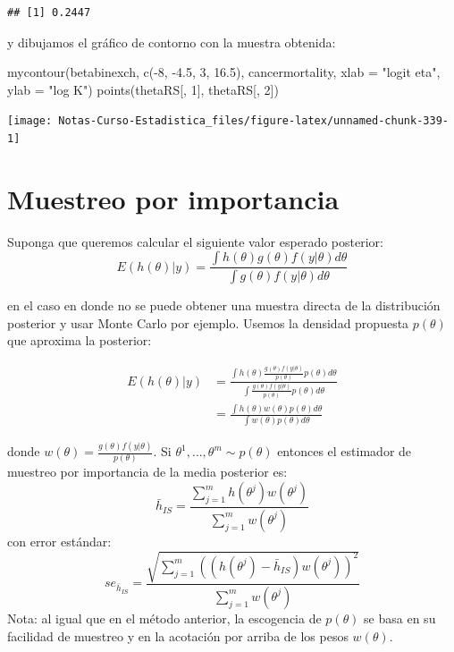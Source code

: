 \documentclass[
  12pt,
]{book}
\newenvironment{Shaded}{\begin{snugshade}}{\end{snugshade}}
\newcommand{\AttributeTok}[1]{\textcolor[rgb]{0.77,0.63,0.00}{#1}}
\newcommand{\DecValTok}[1]{\textcolor[rgb]{0.00,0.00,0.81}{#1}}
\newcommand{\FloatTok}[1]{\textcolor[rgb]{0.00,0.00,0.81}{#1}}
\newcommand{\FunctionTok}[1]{\textcolor[rgb]{0.00,0.00,0.00}{#1}}
\newcommand{\NormalTok}[1]{#1}
\newcommand{\SpecialCharTok}[1]{\textcolor[rgb]{0.00,0.00,0.00}{#1}}
\newcommand{\StringTok}[1]{\textcolor[rgb]{0.31,0.60,0.02}{#1}}
\theoremstyle{definition}
\theoremstyle{definition}
\theoremstyle{definition}
\theoremstyle{definition}
\theoremstyle{remark}
\begin{document}
\begin{verbatim}
## [1] 0.2447
\end{verbatim}

y dibujamos el gráfico de contorno con la muestra obtenida:

\begin{Shaded}
\begin{Highlighting}[]
\FunctionTok{mycontour}\NormalTok{(betabinexch, }\FunctionTok{c}\NormalTok{(}\SpecialCharTok{{-}}\DecValTok{8}\NormalTok{, }\SpecialCharTok{{-}}\FloatTok{4.5}\NormalTok{, }\DecValTok{3}\NormalTok{, }\FloatTok{16.5}\NormalTok{), cancermortality,}
    \AttributeTok{xlab =} \StringTok{"logit eta"}\NormalTok{, }\AttributeTok{ylab =} \StringTok{"log K"}\NormalTok{)}
\FunctionTok{points}\NormalTok{(thetaRS[, }\DecValTok{1}\NormalTok{], thetaRS[, }\DecValTok{2}\NormalTok{])}
\end{Highlighting}
\end{Shaded}

\begin{center}\texttt{[image: Notas-Curso-Estadistica\_files/figure-latex/unnamed-chunk-339-1]} \end{center}

\hypertarget{muestreo-por-importancia}{%
\section{Muestreo por importancia}\label{muestreo-por-importancia}}

Suponga que queremos calcular el siguiente valor esperado posterior:
\[E(h(\theta)|y)=\frac{\int h(\theta)g(\theta)f(y|\theta)d\theta}{\int g(\theta)f(y|\theta)d\theta}\]

en el caso en donde no se puede obtener una muestra directa de la distribución posterior y usar Monte Carlo por ejemplo. Usemos la densidad propuesta \(p(\theta)\) que aproxima la posterior:

\begin{align*}
E(h(\theta)|y)&=\frac{\int h(\theta)\frac{g(\theta)f(y|\theta)}{p(\theta)}p(\theta)d\theta}{\int \frac{g(\theta)f(y|\theta)}{p(\theta)}p(\theta)d\theta}\\
&=\frac{\int h(\theta)w(\theta)p(\theta)d\theta}{\int w(\theta)p(\theta)d\theta}
\end{align*}

donde \(w(\theta)=\frac{g(\theta)f(y|\theta)}{p(\theta)}\). Si \(\theta^1,\ldots,\theta^{m}\sim p(\theta)\) entonces el estimador de muestreo por importancia de la media posterior es:
\[\bar h_{IS}=\frac{\sum_{j=1}^mh(\theta^j)w(\theta^j)}{\sum_{j=1}^mw(\theta^j)}\]
con error estándar:
\[se_{\bar h_{IS}}=\frac{\sqrt{\sum_{j=1}^m((h(\theta^j)-\bar h_{IS})w(\theta^j))^2}}{\sum_{j=1}^mw(\theta^j)}\]
Nota: al igual que en el método anterior, la escogencia de \(p(\theta)\) se basa en su facilidad de muestreo y en la acotación por arriba de los pesos \(w(\theta)\).
\end{document}
